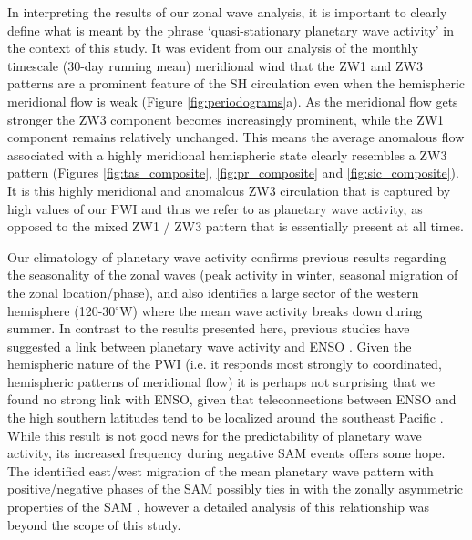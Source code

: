 In interpreting the results of our zonal wave analysis, it is important to clearly define what is meant by the phrase `quasi-stationary planetary wave activity' in the context of this study. It was evident from our analysis of the monthly timescale (30-day running mean) meridional wind that the ZW1 and ZW3 patterns are a prominent feature of the SH circulation even when the hemispheric meridional flow is weak (Figure \ref{fig:periodograms}a). As the meridional flow gets stronger the ZW3 component becomes increasingly prominent, while the ZW1 component remains relatively unchanged. This means the average anomalous flow associated with a highly meridional hemispheric state clearly resembles a ZW3 pattern (Figures \ref{fig:tas_composite}, \ref{fig:pr_composite} and \ref{fig:sic_composite}). It is this highly meridional and anomalous ZW3 circulation that is captured by high values of our PWI and thus we refer to as planetary wave activity, as opposed to the mixed ZW1 / ZW3 pattern that is essentially present at all times.  

Our climatology of planetary wave activity confirms previous results regarding the seasonality of the zonal waves (peak activity in winter, seasonal migration of the zonal location/phase), and also identifies a large sector of the western hemisphere (120-30$^{\circ}$W) where the mean wave activity breaks down during summer. In contrast to the results presented here, previous studies have suggested a link between planetary wave activity and ENSO \citep[e.g.][]{Trenberth1980,Raphael2003,Hobbs2007}. Given the hemispheric nature of the PWI (i.e. it responds most strongly to coordinated, hemispheric patterns of meridional flow) it is perhaps not surprising that we found no strong link with ENSO, given that teleconnections between ENSO and the high southern latitudes tend to be localized around the southeast Pacific \citep{Simmonds1995,Turner2004}. While this result is not good news for the predictability of planetary wave activity, its increased frequency during negative SAM events offers some hope. The identified east/west migration of the mean planetary wave pattern with positive/negative phases of the SAM possibly ties in with the zonally asymmetric properties of the SAM \citep[e.g.][]{Kidson1988,Kidston2009}, however a detailed analysis of this relationship was beyond the scope of this study.

